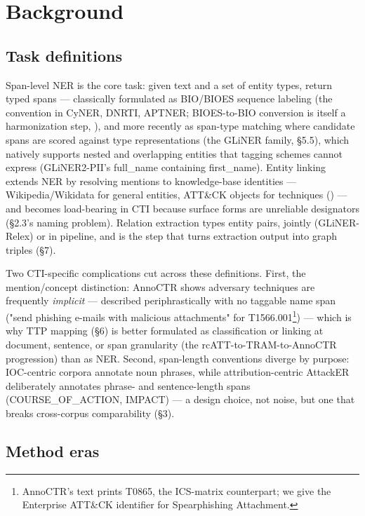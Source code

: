\documentclass[11pt]{article}
\begin{document}
\section{Background}

\subsection{Task definitions}

Span-level NER is the core task: given text and a set of entity types, return typed spans — classically formulated as BIO/BIOES sequence labeling (the convention in CyNER, DNRTI, APTNER; BIOES-to-BIO conversion is itself a harmonization step, \citealp{echchammakhy2025cyberner}), and more recently as span-type matching where candidate spans are scored against type representations (the GLiNER family, §5.5), which natively supports nested and overlapping entities that tagging schemes cannot express (GLiNER2-PII's full\_name containing first\_name). Entity linking extends NER by resolving mentions to knowledge-base identities — Wikipedia/Wikidata for general entities, ATT\&CK objects for techniques (\citealp{lange2024annoctr,hanks2022recognizing}) — and becomes load-bearing in CTI because surface forms are unreliable designators (§2.3's naming problem). Relation extraction types entity pairs, jointly (GLiNER-Relex) or in pipeline, and is the step that turns extraction output into graph triples (§7).

Two CTI-specific complications cut across these definitions. First, the mention/concept distinction: AnnoCTR shows adversary techniques are frequently \emph{implicit} — described periphrastically with no taggable name span ("send phishing e-mails with malicious attachments" for T1566.001\footnote{AnnoCTR's text prints T0865, the ICS-matrix counterpart; we give the Enterprise ATT\&CK identifier for Spearphishing Attachment.}) — which is why TTP mapping (§6) is better formulated as classification or linking at document, sentence, or span granularity (the rcATT-to-TRAM-to-AnnoCTR progression) than as NER. Second, span-length conventions diverge by purpose: IOC-centric corpora annotate noun phrases, while attribution-centric AttackER deliberately annotates phrase- and sentence-length spans (COURSE\_OF\_ACTION, IMPACT) — a design choice, not noise, but one that breaks cross-corpus comparability (§3).

\subsection{Method eras}
\end{document}
